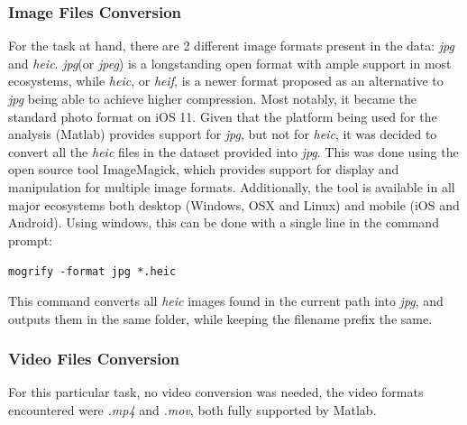 \documentclass[11pt]{article}
\begin{document}
    \subsubsection{Image Files Conversion}
        For the task at hand, there are 2 different image formats present in the data: \textit{jpg} and \textit{heic}. \textit{jpg}(or \textit{jpeg}) is a longstanding open format with ample support in most ecosystems, while \textit{heic}, or \textit{heif}, is a newer format proposed as an alternative to \textit{jpg} being able to achieve higher compression. Most notably, it became the standard photo format on iOS 11. Given that the platform being used for the analysis (Matlab) provides support for \textit{jpg}, but not for \textit{heic}, it was decided to convert all the \textit{heic} files in the dataset provided into \textit{jpg}. This was done using the open source tool ImageMagick, which provides support for display and manipulation for multiple image formats. Additionally, the tool is available in all major ecosystems both desktop (Windows, OSX and Linux) and mobile (iOS and Android). Using windows, this can be done with a single line in the command prompt:

        \texttt{mogrify  -format jpg   *.heic}

        This command converts all \textit{heic} images found in the current path into \textit{jpg}, and outputs them in the same folder, while keeping the filename prefix the same.

    \subsubsection{Video Files Conversion}
        For this particular task, no video conversion was needed, the video formats encountered were \textit{.mp4} and \textit{.mov}, both fully supported by Matlab.
\end{document}
